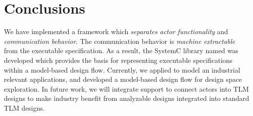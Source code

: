 \chapter{Conclusions}\label{sec:conclusions}

We have implemented a framework which \emph{separates actor functionality} and \emph{communication behavior}.
The communication behavior is \emph{machine extractable} from the executable specification.
As a result, the SystemC library named \SysteMoC{} was developed which provides the basis for representing executable specifications within a model-based design flow.
Currently, we applied \SysteMoC{} to model an industrial relevant applications, and developed a model-based design flow for design space exploration.
In future work, we will integrate support to connect \SysteMoC{} actors into TLM designs to make industry benefit from analyzable \SysteMoC{} designs integrated into standard TLM designs.

